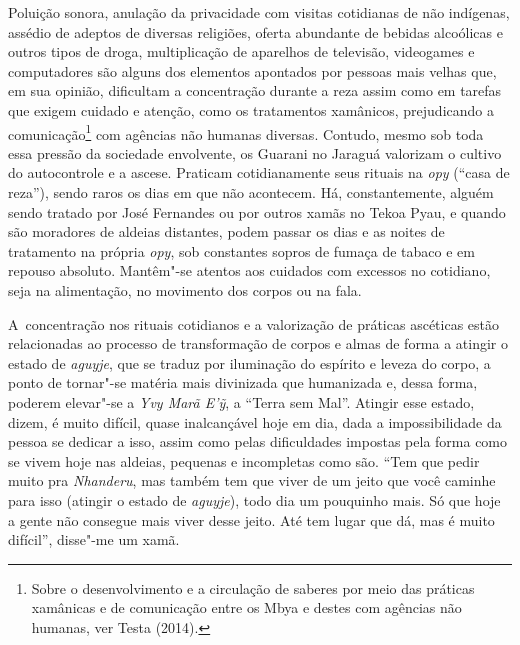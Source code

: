 Poluição sonora, anulação da privacidade com visitas cotidianas de não
indígenas, assédio de adeptos de diversas religiões, oferta abundante
de bebidas alcoólicas e outros tipos de droga, multiplicação de
aparelhos de televisão, videogames e computadores são alguns dos
elementos apontados por pessoas mais velhas que, em sua opinião,
dificultam a concentração durante a reza assim como em tarefas que
exigem cuidado e atenção, como os tratamentos xamânicos, prejudicando a
comunicação\footnote{Sobre o desenvolvimento e a circulação de saberes
por meio das práticas xamânicas e de comunicação entre os Mbya e destes
com agências não humanas, ver Testa (2014).} com agências não humanas
diversas. Contudo, mesmo sob toda essa pressão da sociedade envolvente,
os Guarani no Jaraguá valorizam o cultivo do autocontrole e a ascese.
Praticam cotidianamente seus rituais na \emph{opy} (``casa de reza''), sendo
raros os dias em que não acontecem. Há, constantemente, alguém sendo
tratado por José Fernandes ou por outros xamãs no Tekoa Pyau, e quando
são moradores de aldeias distantes, podem passar os dias e as noites de
tratamento na própria \emph{opy}, sob constantes sopros de fumaça de tabaco e
em repouso absoluto. Mantêm"-se atentos aos cuidados com excessos no
cotidiano, seja na alimentação, no movimento dos corpos ou na fala.

A~concentração nos rituais cotidianos e a valorização de práticas
ascéticas estão relacionadas ao processo de transformação de corpos e
almas de forma a atingir o estado de \emph{aguyje}, que se traduz por
iluminação do espírito e leveza do corpo, a ponto de tornar"-se matéria
mais divinizada que humanizada e, dessa forma, poderem elevar"-se a \emph{Yvy
Marã E’\~{y}}, a ``Terra sem Mal''. Atingir esse estado, dizem, é muito
difícil, quase inalcançável hoje em dia, dada a impossibilidade da
pessoa se dedicar a isso, assim como pelas dificuldades impostas pela
forma como se vivem hoje nas aldeias, pequenas e incompletas como são.
``Tem que pedir muito pra \emph{Nhanderu}, mas também tem que viver de um jeito
que você caminhe para isso (atingir o estado de \emph{aguyje}), todo dia um
pouquinho mais. Só que hoje a gente não consegue mais viver desse
jeito. Até tem lugar que dá, mas é muito difícil'', disse"-me um xamã.

